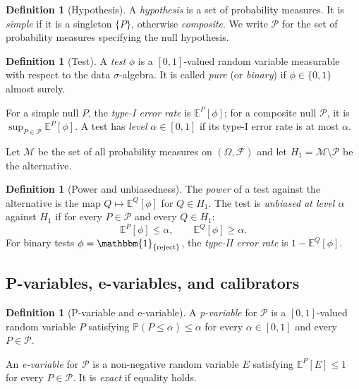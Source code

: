 \documentclass[11pt,a4paper]{article}
\theoremstyle{plain}
\theoremstyle{definition}
\newtheorem{definition}[theorem]{Definition}
\theoremstyle{remark}
\newcommand{\E}{\mathbb{E}}
\newcommand{\Prob}{\mathbb{P}}
\newcommand{\ind}{\mathbbm{1}}
\begin{document}
\begin{definition}[Hypothesis]
A \emph{hypothesis} is a set of probability measures. It is \emph{simple} if
it is a singleton $\{P\}$, otherwise \emph{composite}. We write $\mathcal{P}$
for the set of probability measures specifying the null hypothesis.
\end{definition}

\begin{definition}[Test]
A \emph{test} $\phi$ is a $[0,1]$-valued random variable measurable with
respect to the data $\sigma$-algebra. It is called \emph{pure} (or
\emph{binary}) if $\phi \in \{0,1\}$ almost surely.

For a simple null $P$, the \emph{type-I error rate} is $\E^P[\phi]$; for a
composite null $\mathcal{P}$, it is $\sup_{P \in \mathcal{P}} \E^P[\phi]$. A
test has \emph{level} $\alpha \in [0,1]$ if its type-I error rate is at most
$\alpha$.
\end{definition}

Let $\mathcal{M}$ be the set of all probability measures on $(\Omega,
\mathcal{F})$ and let $H_1 = \mathcal{M} \setminus \mathcal{P}$ be the
alternative.

\begin{definition}[Power and unbiasedness]
The \emph{power} of a test against the alternative is the map $Q \mapsto
\E^Q[\phi]$ for $Q \in H_1$. The test is \emph{unbiased at level $\alpha$}
against $H_1$ if for every $P \in \mathcal{P}$ and every $Q \in H_1$:
\[
  \E^P[\phi] \leq \alpha, \qquad \E^Q[\phi] \geq \alpha.
\]
For binary tests $\phi = \ind_{\{\text{reject}\}}$, the \emph{type-II error
rate} is $1 - \E^Q[\phi]$.
\end{definition}

\subsection{P-variables, e-variables, and calibrators}
\label{sec:pe}

\begin{definition}[P-variable and e-variable]
A \emph{p-variable} for $\mathcal{P}$ is a $[0,1]$-valued random variable $P$
satisfying $\Prob(P \le \alpha) \le \alpha$ for every $\alpha \in [0,1]$ and
every $P \in \mathcal{P}$.

An \emph{e-variable} for $\mathcal{P}$ is a non-negative random variable $E$
satisfying $\E^P[E] \le 1$ for every $P \in \mathcal{P}$. It is \emph{exact}
if equality holds.
\end{definition}
\end{document}
